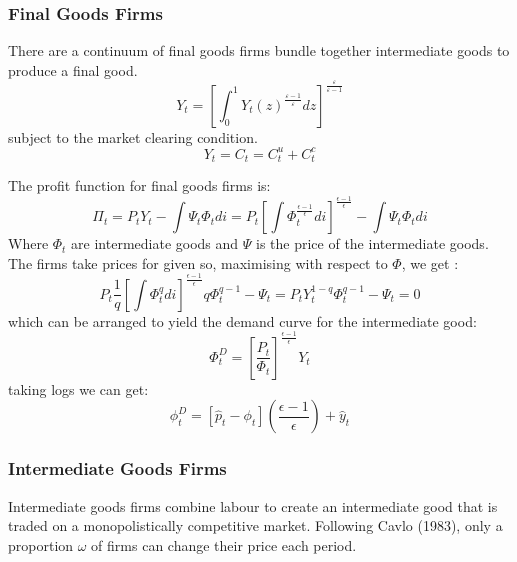 \documentclass[11pt, a4paper]{article}
\begin{document}
\subsubsection{Final Goods Firms}

There are a continuum of final goods firms bundle together intermediate goods to produce a final good. 
\begin{equation}
Y_{t}=\left[\int_{0}^{1} Y_{t}(z)^{\frac{\varepsilon-1}{\varepsilon}} d z\right]^{\frac{\varepsilon}{\varepsilon-1}}
\end{equation}
subject to the market clearing condition.
\begin{equation}
Y_{t}=C_{t}=C_{t}^{u}+C_{t}^{c}
\end{equation}

The profit function for final goods firms is:
\begin{equation}
\Pi_{t}=P_{t} Y_{t}-\int \Psi_{t} \Phi_{t} d i=P_{t}\left[\int \Phi_{t}^{\frac{\epsilon - 1}{\epsilon}} d i\right]^{\frac{\epsilon - 1}{\epsilon}}-\int \Psi_{t} \Phi_{t} d i
\end{equation}
Where $\Phi_t$ are intermediate goods and $\Psi$ is the price of the intermediate goods. The firms take prices for given so, maximising with respect to $\Phi$, we get :
\begin{equation}
P_{t} \frac{1}{q}\left[\int \Phi_{t}^{q} d i\right]^{\frac{\epsilon - 1}{\epsilon}} q \Phi_{t}^{q-1}-\Psi_{t}=P_{t} Y_{t}^{1-q} \Phi_{t}^{q-1}-\Psi_{t}=0
\end{equation}
which can be arranged to yield the demand curve for the intermediate good:
\begin{equation}
\Phi_{t}^{D}=\left[\frac{P_{t}}{\Phi_{t}}\right]^{\frac{\epsilon - 1}{\epsilon}} Y_{t}
\end{equation}
taking logs we can get:
\begin{equation}
  \phi^D_t = [\hat p_t -\phi_t] \left(\frac{\epsilon - 1}{\epsilon}\right) + \hat  y_t
\end{equation}


\subsubsection{Intermediate Goods Firms}

Intermediate goods firms combine labour to create an intermediate good that is traded on a monopolistically competitive market. Following Cavlo (1983), only a proportion $\omega$ of firms can change their price each period.
\end{document}
